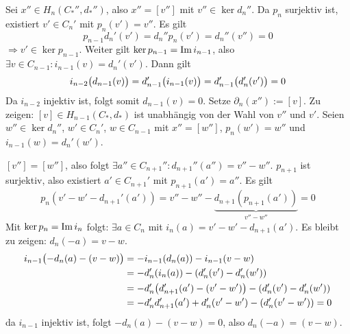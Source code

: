 Sei $x'' \in H_n(C_*'',d_*'')$, also $x'' = [v'']$ mit $v'' \in \ker d_n''$. Da $p_n$ surjektiv ist, existiert $v' \in C_n'$ mit $p_n(v')=v''$. Es gilt
\[
	p_{n-1} d_n'(v') = d_n'' p_n(v') = d_n''(v'') = 0
\]
$\Rightarrow v' \in \ker p_{n-1}$. Weiter gilt $\ker p_{n-1}= \im i_{n-1}$, also $\exists v \in C_{n-1} : i_{n-1}(v)= d_n'(v')$. Dann gilt
\[
	i_{n-2} \enbrace[\big]{d_{n-1}(v)} = d'_{n-1} \enbrace[\big]{i_{n-1}(v)} = d_{n-1}' \enbrace[\big]{d_n'(v')} = 0   
\]
Da $i_{n-2}$ injektiv ist, folgt somit $d_{n-1}(v)=0$. Setze $\partial_n(x'') := [v]$. Zu zeigen: $[v] \in H_{n-1}(C_*,d_*)$ ist unabhängig von der Wahl von $v''$ und $v'$.
Seien $w'' \in \ker d_n''$, $w' \in C_n'$, $w \in C_{n-1}$ mit $x''=[w'']$, $p_n(w')=w''$ und $i_{n-1}(w)= d_n'(w')$. 

$[v'']=[w'']$, also folgt $\exists a'' \in C_{n+1}'' : d_{n+1}'' (a'')=v'' - w''$. $p_{n+1}$ ist surjektiv, also existiert $a' \in C_{n+1}'$ mit
$p_{n+1}(a')=a''$. Es gilt
\[
	p_n(v'-w'- d_{n+1}'(a')) = v'' - w'' - \underbrace{d_{n+1}(p_{n+1}(a'))}_{v''- w''} = 0
\]
Mit $\ker p_n = \im i_n$ folgt: $\exists a \in C_n$ mit $i_n(a)=v'- w' - d_{n+1}(a')$. Es bleibt zu zeigen: $d_n(-a)= v-w$.
\begin{align*}
	i_{n-1} \enbrace[\big]{-d_n(a)- (v-w)} & = -i_{n-1} \enbrace*{d_n(a)} - i_{n-1}(v-w) \\ &= - d_n' \enbrace*{i_n(a)} - \enbrace*{d_n'(v')- d_n'(w')}  \\  
	&= -d_n' \enbrace*{ d_{n+1}' (a') - (v'-w')} - \enbrace*{ d_n'(v') - d_n'(w')}  \\
	&= - d_n' d_{n+1}' (a') + d_n'(v'- w') -  \enbrace*{d_n'(v'-w')} = 0
\end{align*}
da $i_{n-1}$ injektiv ist, folgt $-d_n(a)- (v-w) = 0$, also $d_n(-a)=(v-w)$.
